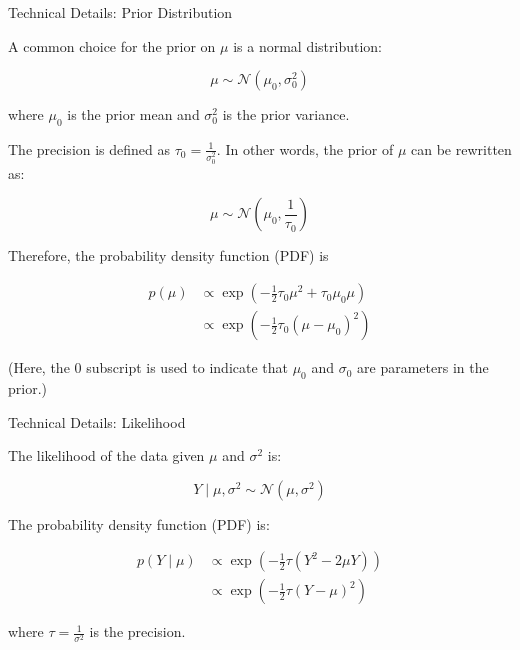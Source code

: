 \begin{frame}{Technical Details: Prior Distribution}

A common choice for the prior on $ \mu $ is a normal distribution:

$$
\mu \sim \mathcal{N}(\mu_0, \sigma_0^2)
$$

where $ \mu_0 $ is the prior mean and $ \sigma_0^2 $ is the prior variance. 

The precision is defined as $\tau_0 = \frac{1}{\sigma_0^2}$. In other words, the prior of $\mu$ can be rewritten as:

$$
\mu \sim \mathcal{N}(\mu_0, \frac{1}{\tau_0})
$$

Therefore, the probability density function (PDF) is 

$$
\begin{align}
p(\mu)&\propto \exp\left(-\frac{1}{2}\tau_0\mu^2 + \tau_0\mu_0 \mu\right) \\
       &\propto \exp\left(-\frac{1}{2}\tau_0 (\mu - \mu_0)^2\right)
\end{align}
$$

(Here, the 0 subscript is used to indicate that $\mu_0$ and $\sigma_0$ are parameters in the prior.)

\end{frame}

\begin{frame}{Technical Details: Likelihood}

The likelihood of the data given $\mu$ and $\sigma^2$ is:

$$
Y\mid\mu, \sigma^2 \sim \mathcal{N}(\mu, \sigma^2)
$$

The probability density function (PDF) is:

$$
\begin{align}
p(Y\mid\mu) &\propto \exp\left(-\frac{1}{2} \tau (Y^2 - 2\mu Y)\right)\\
&\propto \exp\left(-\frac{1}{2} \tau (Y - \mu)^2\right)
\end{align}
$$

where $\tau = \frac{1}{\sigma^2}$ is the precision.

\end{frame}

